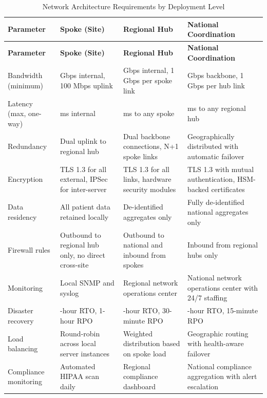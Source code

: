 \begin{longtable}{l >{\raggedright\arraybackslash}p{3.5cm} >{\raggedright\arraybackslash}p{3.5cm} >{\raggedright\arraybackslash}p{4.0cm}}
\caption{Network Architecture Requirements by Deployment Level}
\label{tab:mcp-network-config} \\
\toprule
\textbf{Parameter} & \textbf{Spoke (Site)} & \textbf{Regional Hub} & \textbf{National Coordination} \\
\midrule
\endfirsthead
\toprule
\textbf{Parameter} & \textbf{Spoke (Site)} & \textbf{Regional Hub} & \textbf{National Coordination} \\
\midrule
\endhead
\bottomrule
\endfoot
\bottomrule
\endlastfoot
Bandwidth (minimum) & 1 Gbps internal, 100 Mbps uplink & 10 Gbps internal, 1 Gbps per spoke link & 10 Gbps backbone, 1 Gbps per hub link \\
\midrule
Latency (max, one-way) & 5 ms internal & 20 ms to any spoke & 50 ms to any regional hub \\
\midrule
Redundancy & Dual uplink to regional hub & Dual backbone connections, N+1 spoke links & Geographically distributed with automatic failover \\
\midrule
Encryption & TLS 1.3 for all external, IPSec for inter-server & TLS 1.3 for all links, hardware security modules & TLS 1.3 with mutual authentication, HSM-backed certificates \\
\midrule
Data residency & All patient data retained locally & De-identified aggregates only & Fully de-identified national aggregates only \\
\midrule
Firewall rules & Outbound to regional hub only, no direct cross-site & Outbound to national and inbound from spokes & Inbound from regional hubs only \\
\midrule
Monitoring & Local SNMP and syslog & Regional network operations center & National network operations center with 24/7 staffing \\
\midrule
Disaster recovery & 4-hour RTO, 1-hour RPO & 2-hour RTO, 30-minute RPO & 1-hour RTO, 15-minute RPO \\
\midrule
Load balancing & Round-robin across local server instances & Weighted distribution based on spoke load & Geographic routing with health-aware failover \\
\midrule
Compliance monitoring & Automated HIPAA scan daily & Regional compliance dashboard & National compliance aggregation with alert escalation \\
\end{longtable}

